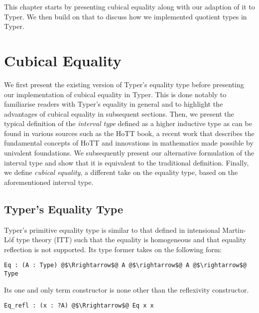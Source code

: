 \documentclass[12pt,twoside,maitrise]{dms}
\theoremstyle{definition}
\numberwithin{equation}{section}
\numberwithin{table}{chapter}
\numberwithin{figure}{chapter}
\begin{document}
This chapter starts by presenting cubical equality along with our adaption of it
to Typer. We then build on that to discuss how we implemented quotient types in
Typer.

\section{Cubical Equality}

We first present the existing version of Typer's equality type before presenting
our implementation of cubical equality in Typer. This is done notably to
familiarise readers with Typer's equality in general and to highlight the
advantages of cubical equality in subsequent sections. Then, we present the
typical definition of the \emph{interval type} defined as a higher inductive
type as can be found in various sources such as the HoTT
book\cite[Chap~6.3]{HoTTbook}, a recent work that describes the fundamental
concepts of HoTT and innovations in mathematics made possible by univalent
foundations. We subsequently present our alternative formulation of the interval
type and show that it is equivalent to the traditional definition. Finally, we
define \emph{cubical equality}, a different take on the equality type, based on
the aforementioned interval type.

\subsection{Typer's Equality Type}\label{sec:typer-old-eq}

Typer's primitive equality type is similar to that defined in intensional
Martin-Löf type theory\cite{martin1975intuitionistic} (ITT) such that the
equality is homogeneous and that equality reflection is not supported. Its type
former takes on the following form:

\begin{verbatim}
Eq : (A : Type) @$\Rrightarrow$@ A @$\rightarrow$@ A @$\rightarrow$@ Type
\end{verbatim}

Its one and only term constructor is none other than the reflexivity constructor.

\begin{verbatim}
Eq_refl : (x : ?A) @$\Rrightarrow$@ Eq x x
\end{verbatim}
\end{document}
